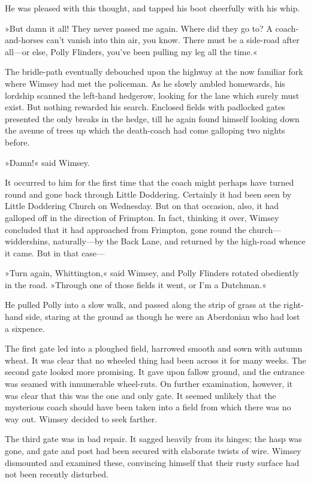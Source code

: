 He was pleased with this thought, and tapped his boot cheerfully with his whip.

»But damn it all! They never passed me again. Where did they go to? A coach-and-horses can't vanish into thin air, you know. There must be a side-road after all—or else, Polly Flinders, you've been pulling my leg all the time.«

The bridle-path eventually debouched upon the highway at the now familiar fork where Wimsey had met the policeman. As he slowly ambled homewards, his lordship scanned the left-hand hedgerow, looking for the lane which surely must exist. But nothing rewarded his search. Enclosed fields with padlocked gates presented the only breaks in the hedge, till he again found himself looking down the avenue of trees up which the death-coach had come galloping two nights before.

»Damn!« said Wimsey.

It occurred to him for the first time that the coach might perhaps have turned round and gone back through Little Doddering. Certainly it had been seen by Little Doddering Church on Wednesday. But on that occasion, also, it had galloped off in the direction of Frimpton. In fact, thinking it over, Wimsey concluded that it had approached from Frimpton, gone round the church—widdershins, naturally—by the Back Lane, and returned by the high-road whence it came. But in that case—

»Turn again, Whittington,« said Wimsey, and Polly Flinders rotated obediently in the road. »Through one of those fields it went, or I'm a Dutchman.«

He pulled Polly into a slow walk, and passed along the strip of grass at the right-hand side, staring at the ground as though he were an Aberdonian who had lost a sixpence.

The first gate led into a ploughed field, harrowed smooth and sown with autumn wheat. It was clear that no wheeled thing had been across it for many weeks. The second gate looked more promising. It gave upon fallow ground, and the entrance was seamed with innumerable wheel-ruts. On further examination, however, it was clear that this was the one and only gate. It seemed unlikely that the mysterious coach should have been taken into a field from which there was no way out. Wimsey decided to seek farther.

The third gate was in bad repair. It sagged heavily from its hinges; the hasp was gone, and gate and post had been secured with elaborate twists of wire. Wimsey dismounted and examined these, convincing himself that their rusty surface had not been recently disturbed.

